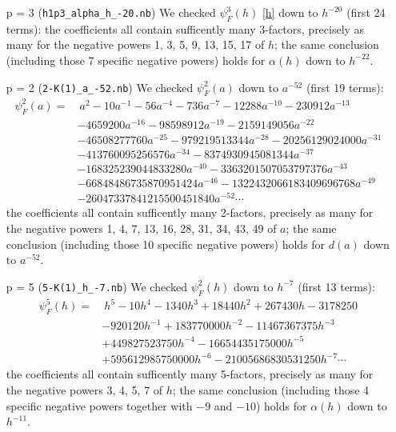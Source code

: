 \documentclass{rs}
\theoremstyle{definition}
\theoremstyle{remark}
\newcommand{\A}{\alpha}
\newcommand{\p}{\psi^3}
\numberwithin{equation}{section}
\numberwithin{thm}{section}
\begin{document}
\begin{itemize}
 \item [p = 3] (\texttt{h1p3\_alpha\_h\_-20.nb}) We checked $\p_F(h)$ \eqref{h} down to $h^{-20}$ (first 24 terms): 
 the coefficients all contain sufficently many 3-factors, 
 precisely as many for the negative powers 1, 3, 5, 9, 13, 15, 17 of $h$; 
 the same conclusion (including those 7 specific negative powers) holds for $\A(h)$ down to $h^{-22}$.  

 \item [p = 2] (\texttt{2-K(1)\_a\_-52.nb}) We checked $\psi^2_F(a)$ down to $a^{-52}$ (first 19 terms): 
 \begin{equation*}
 \begin{split}
  \psi^2_F(a) = & ~ a^2 - 10 a^{-1} - 56 a^{-4} - 736 a^{-7} - 12288 a^{-10} - 230912 a^{-13} \\
                & - 4659200 a^{-16} - 98598912 a^{-19} - 2159149056 a^{-22} \\
                & - 46508277760 a^{-25} - 979219513344 a^{-28} - 20256129024000 a^{-31} \\
                & - 413760095256576 a^{-34} - 8374930945081344 a^{-37} \\
                & - 168325239044833280 a^{-40} - 3363201507053797376 a^{-43} \\
                & - 66848486735870951424 a^{-46} - 1322432066183409696768 a^{-49} \\
                & - 26047337841215500451840 a^{-52} \cdots 
 \end{split}
 \end{equation*}
 the coefficients all contain sufficently many 2-factors, 
 precisely as many for the negative powers 1, 4, 7, 13, 16, 28, 31, 34, 43, 49 of $a$; 
 the same conclusion (including those 10 specific negative powers) holds for $d(a)$ down to $a^{-52}$.  

 \item [p = 5] (\texttt{5-K(1)\_h\_-7.nb}) We checked $\psi^2_F(h)$ down to $h^{-7}$ (first 13 terms): 
 \begin{equation*}
 \begin{split}
  \psi^5_F(h) = & ~ h^5 - 10 h^4 - 1340 h^3 + 18440 h^2 + 267430 h - 3178250 \\
                & - 920120 h^{-1} + 183770000 h^{-2} - 11467367375 h^{-3} \\
                & + 449827523750 h^{-4} - 16654435175000 h^{-5} \\
                & + 595612985750000 h^{-6} - 21005686830531250 h^{-7} \cdots 
 \end{split}
 \end{equation*}
 the coefficients all contain sufficently many 5-factors, 
 precisely as many for the negative powers 3, 4, 5, 7 of $h$; 
 the same conclusion (including those 4 specific negative powers together with $-9$ and $-10$) holds for $\A(h)$ down to $h^{-11}$.  
\end{itemize}
\end{document}
